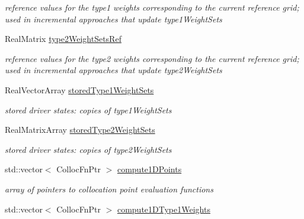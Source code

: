 \begin{DoxyCompactItemize}
\begin{DoxyCompactList}\small\item\em reference values for the type1 weights corresponding to the current reference grid; used in incremental approaches that update type1\+Weight\+Sets \end{DoxyCompactList}\item 
Real\+Matrix \hyperlink{classPecos_1_1CombinedSparseGridDriver_a1f0ca6216a4f2b35bef2ba37421780cb}{type2\+Weight\+Sets\+Ref}\label{classPecos_1_1CombinedSparseGridDriver_a1f0ca6216a4f2b35bef2ba37421780cb}

\begin{DoxyCompactList}\small\item\em reference values for the type2 weights corresponding to the current reference grid; used in incremental approaches that update type2\+Weight\+Sets \end{DoxyCompactList}\item 
Real\+Vector\+Array \hyperlink{classPecos_1_1CombinedSparseGridDriver_a2156536b40c41239c3a68b7e13cbc318}{stored\+Type1\+Weight\+Sets}\label{classPecos_1_1CombinedSparseGridDriver_a2156536b40c41239c3a68b7e13cbc318}

\begin{DoxyCompactList}\small\item\em stored driver states\+: copies of type1\+Weight\+Sets \end{DoxyCompactList}\item 
Real\+Matrix\+Array \hyperlink{classPecos_1_1CombinedSparseGridDriver_a09205b80e2cad1bcf686460ebd1597b2}{stored\+Type2\+Weight\+Sets}\label{classPecos_1_1CombinedSparseGridDriver_a09205b80e2cad1bcf686460ebd1597b2}

\begin{DoxyCompactList}\small\item\em stored driver states\+: copies of type2\+Weight\+Sets \end{DoxyCompactList}\item 
std\+::vector$<$ Colloc\+Fn\+Ptr $>$ \hyperlink{classPecos_1_1CombinedSparseGridDriver_aceca665b19415378de420f29a000d801}{compute1\+D\+Points}\label{classPecos_1_1CombinedSparseGridDriver_aceca665b19415378de420f29a000d801}

\begin{DoxyCompactList}\small\item\em array of pointers to collocation point evaluation functions \end{DoxyCompactList}\item 
std\+::vector$<$ Colloc\+Fn\+Ptr $>$ \hyperlink{classPecos_1_1CombinedSparseGridDriver_a9e24ca931d6591003fef704629d18f42}{compute1\+D\+Type1\+Weights}\label{classPecos_1_1CombinedSparseGridDriver_a9e24ca931d6591003fef704629d18f42}


\end{DoxyCompactItemize}
